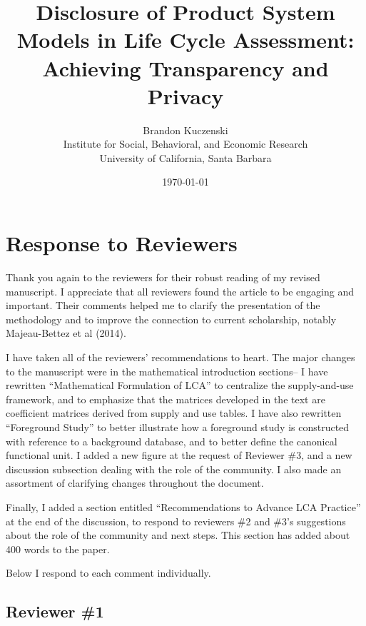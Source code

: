 \documentclass[11pt,letterpaper]{article}
\title{Disclosure of Product System Models in Life Cycle Assessment: Achieving Transparency and Privacy}
\author{Brandon Kuczenski\\
Institute for Social, Behavioral, and Economic Research\\
University of California, Santa Barbara}
\date{\mydate\today}
\begin{document}
\maketitle

\section*{Response to Reviewers}

Thank you again to the reviewers for their robust reading of my revised manuscript.  I appreciate that all reviewers found the article to be engaging and important.  Their comments helped me to clarify the presentation of the methodology and to improve the connection to current scholarship, notably Majeau-Bettez et al (2014).  

I have taken all of the reviewers' recommendations to heart.  The major changes to the manuscript were in the mathematical introduction sections-- I have rewritten ``Mathematical Formulation of LCA'' to centralize the supply-and-use framework, and to emphasize that the matrices developed in the text are coefficient matrices derived from supply and use tables.  I have also rewritten ``Foreground Study'' to better illustrate how a foreground study is constructed with reference to a background database, and to better define the canonical functional unit.  I added a new figure at the request of Reviewer \#3, and a new discussion subsection dealing with the role of the community.  I also made an assortment of clarifying changes throughout the document. 

Finally, I added a section entitled ``Recommendations to Advance LCA Practice'' at the end of the discussion, to respond to reviewers \#2 and \#3's suggestions about the role of the community and next steps.  This section has added about 400 words to the paper.

Below I respond to each comment individually.

\subsection*{Reviewer \#1}
\end{document}
